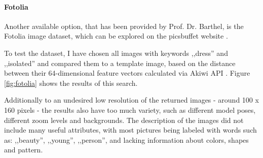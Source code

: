 \documentclass[12pt]{report}
\begin{document}
\paragraph{Fotolia}
Another available option, that has been provided by Prof. Dr. Barthel, is the Fotolia image dataset, which can be explored on the picsbuffet website \cite{noauthor_picsbuffet_nodate}. 

To test the dataset, I have chosen all images with keywords ,,dress'' and ,,isolated'' and compared them to a template image, based on the distance between their 64-dimensional feature vectors calculated via Akiwi API \cite{sonnenberg_akiwi_nodate}. Figure \ref{fig:fotolia} shows the results of this search. 

Additionally to an undesired low resolution of the returned images - around 100 x 160 pixels - the results also have too much variety, such as different model poses, different zoom levels and backgrounds. The description of the images did not include many useful attributes, with most pictures being labeled with words such as: ,,beauty'', ,,young'', ,,person'', and lacking information about colors, shapes and pattern.
\end{document}
